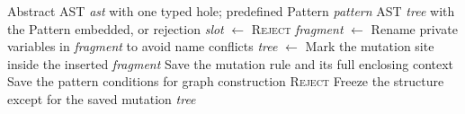 \begin{algorithm}[H]
\caption{Pattern embedding into an AST}
\label{alg:pattern-embedding}
\begin{algorithmic}[1]
\Require Abstract AST \textit{ast} with one typed hole; predefined Pattern \textit{pattern}
\Ensure AST \textit{tree} with the Pattern embedded, or rejection
\State \textit{slot} $\gets$ 
\State \Return \textsc{Reject}
\EndIf
\State \textit{fragment} $\gets$ 
\State Rename private variables in \textit{fragment} to avoid name conflicts
\State \textit{tree} $\gets$ 
\State Mark the mutation site inside the inserted \textit{fragment}
\State Save the mutation rule and its full enclosing context
\State Save the pattern conditions for graph construction
\State \Return \textsc{Reject}
\EndIf
\State Freeze the structure except for the saved mutation
\State \Return \textit{tree}
\end{algorithmic}
\end{algorithm}
